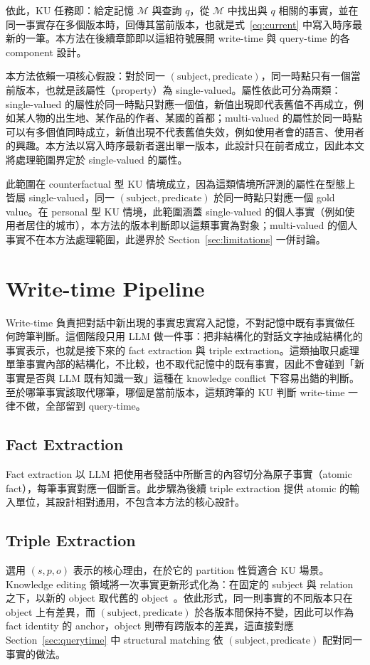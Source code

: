 依此，KU 任務即：給定記憶 $\mathcal{M}$ 與查詢 $q$，從 $\mathcal{M}$ 中找出與 $q$ 相關的事實，並在同一事實存在多個版本時，回傳其當前版本，也就是式~\eqref{eq:current} 中寫入時序最新的一筆。本方法在後續章節即以這組符號展開 write-time 與 query-time 的各 component 設計。
 
本方法依賴一項核心假設：對於同一 $(\text{subject}, \text{predicate})$，同一時點只有一個當前版本，也就是該屬性（property）為 single-valued。屬性依此可分為兩類：single-valued 的屬性於同一時點只對應一個值，新值出現即代表舊值不再成立，例如某人物的出生地、某作品的作者、某國的首都；multi-valued 的屬性於同一時點可以有多個值同時成立，新值出現不代表舊值失效，例如使用者會的語言、使用者的興趣。本方法以寫入時序最新者選出單一版本，此設計只在前者成立，因此本文將處理範圍界定於 single-valued 的屬性。

此範圍在 counterfactual 型 KU 情境成立，因為這類情境所評測的屬性在型態上皆屬 single-valued，同一 $(\text{subject}, \text{predicate})$ 於同一時點只對應一個 gold value。在 personal 型 KU 情境，此範圍涵蓋 single-valued 的個人事實（例如使用者居住的城市），本方法的版本判斷即以這類事實為對象；multi-valued 的個人事實不在本方法處理範圍，此邊界於 Section~\ref{sec:limitations} 一併討論。
 
\section{Write-time Pipeline}
\label{sec:writetime}
Write-time 負責把對話中新出現的事實忠實寫入記憶，不對記憶中既有事實做任何跨筆判斷。這個階段只用 LLM 做一件事：把非結構化的對話文字抽成結構化的事實表示，也就是接下來的 fact extraction 與 triple extraction。這類抽取只處理單筆事實內部的結構化，不比較，也不取代記憶中的既有事實，因此不會碰到「新事實是否與 LLM 既有知識一致」這種在 knowledge conflict 下容易出錯的判斷。至於哪筆事實該取代哪筆，哪個是當前版本，這類跨筆的 KU 判斷 write-time 一律不做，全部留到 query-time。
 
\subsection{Fact Extraction}
\label{subsec:fact_extraction}
Fact extraction 以 LLM 把使用者發話中所斷言的內容切分為原子事實（atomic fact），每筆事實對應一個斷言。此步驟為後續 triple extraction 提供 atomic 的輸入單位，其設計相對通用，不包含本方法的核心設計。
 
\subsection{Triple Extraction}
\label{subsec:triple_extraction}
選用 $(s, p, o)$ 表示的核心理由，在於它的 partition 性質適合 KU 場景。Knowledge editing 領域將一次事實更新形式化為：在固定的 subject 與 relation 之下，以新的 object 取代舊的 object~\cite{cohen2024evaluating}。依此形式，同一則事實的不同版本只在 object 上有差異，而 $(\text{subject}, \text{predicate})$ 於各版本間保持不變，因此可以作為 fact identity 的 anchor，object 則帶有跨版本的差異，這直接對應 Section~\ref{sec:querytime} 中 structural matching 依 $(\text{subject}, \text{predicate})$ 配對同一事實的做法。
 
